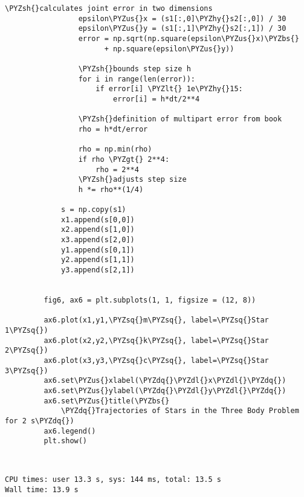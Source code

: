 \documentclass[11pt]{article}
\def\PYZsq{\textquotesingle}%
\def\PYZbs{\char`\\}
\def\PYZus{\char`\_}
\def\PYZlt{\char`\<}
\def\PYZgt{\char`\>}
\def\PYZsh{\char`\#}
\def\PYZdl{\char`\$}
\def\PYZhy{\char`\-}
\def\PYZsq{\char`\'}
\def\PYZdq{\char`\"}
\begin{document}
\begin{Verbatim}[commandchars=\\\{\}]
                 \PYZsh{}calculates joint error in two dimensions
                 epsilon\PYZus{}x = (s1[:,0]\PYZhy{}s2[:,0]) / 30
                 epsilon\PYZus{}y = (s1[:,1]\PYZhy{}s2[:,1]) / 30
                 error = np.sqrt(np.square(epsilon\PYZus{}x)\PYZbs{}
                       + np.square(epsilon\PYZus{}y))
         
                 \PYZsh{}bounds step size h
                 for i in range(len(error)):
                     if error[i] \PYZlt{} 1e\PYZhy{}15:
                         error[i] = h*dt/2**4
         
                 \PYZsh{}definition of multipart error from book
                 rho = h*dt/error
         
                 rho = np.min(rho)
                 if rho \PYZgt{} 2**4:
                     rho = 2**4
                 \PYZsh{}adjusts step size
                 h *= rho**(1/4)
         
             s = np.copy(s1)
             x1.append(s[0,0])
             x2.append(s[1,0])
             x3.append(s[2,0])
             y1.append(s[0,1])
             y2.append(s[1,1])
             y3.append(s[2,1])
         
         
         fig6, ax6 = plt.subplots(1, 1, figsize = (12, 8))
         
         ax6.plot(x1,y1,\PYZsq{}m\PYZsq{}, label=\PYZsq{}Star 1\PYZsq{})
         ax6.plot(x2,y2,\PYZsq{}k\PYZsq{}, label=\PYZsq{}Star 2\PYZsq{})
         ax6.plot(x3,y3,\PYZsq{}c\PYZsq{}, label=\PYZsq{}Star 3\PYZsq{})
         ax6.set\PYZus{}xlabel(\PYZdq{}\PYZdl{}x\PYZdl{}\PYZdq{})
         ax6.set\PYZus{}ylabel(\PYZdq{}\PYZdl{}y\PYZdl{}\PYZdq{})
         ax6.set\PYZus{}title(\PYZbs{}
             \PYZdq{}Trajectories of Stars in the Three Body Problem for 2 s\PYZdq{})
         ax6.legend()
         plt.show()
\end{Verbatim}

    \begin{center}
    \end{center}
    { \hspace*{\fill} \\}
    
    \begin{Verbatim}[commandchars=\\\{\}]
CPU times: user 13.3 s, sys: 144 ms, total: 13.5 s
Wall time: 13.9 s

    \end{Verbatim}
\end{document}
